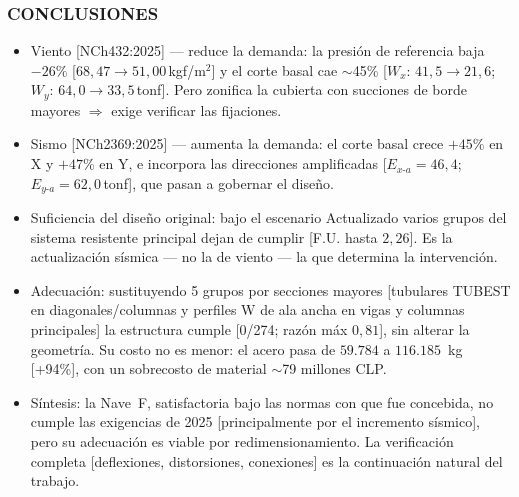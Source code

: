 ﻿\documentclass[11.5pt,aspectratio=169,handout]{beamer}
\newcommand{\ctitle}[1]{\frametitle{#1}}
\begin{document}
\begin{frame}
\ctitle{CONCLUSIONES}
\vspace{-2mm}
\begin{itemize}\scriptsize\setlength{\itemsep}{1.6mm}
  \item \alert{Viento [NCh432:2025]} --- \alert{reduce} la demanda: la presión de referencia
        baja $-26\%$ [$68{,}47 \to 51{,}00$\,kgf/m$^2$] y el corte basal cae $\sim$45\%
        [$W_x$: $41{,}5\to21{,}6$; $W_y$: $64{,}0\to33{,}5$\,tonf]. Pero zonifica la cubierta
        con \alert{succiones de borde mayores} $\Rightarrow$ exige verificar las fijaciones.
  \item \alert{Sismo [NCh2369:2025]} --- \alert{aumenta} la demanda: el corte basal crece
        $+45\%$ en X y $+47\%$ en Y, e incorpora las direcciones \alert{amplificadas}
        [$E_{x\text{-}a}=46{,}4$; $E_{y\text{-}a}=62{,}0$\,tonf], que pasan a \alert{gobernar}
        el diseño.
  \item \alert{Suficiencia del diseño original}: bajo el escenario Actualizado varios grupos
        del sistema resistente principal \alert{dejan de cumplir} [F.U. hasta $2{,}26$]. Es la
        actualización \alert{sísmica} --- no la de viento --- la que determina la intervención.
  \item \alert{Adecuación}: sustituyendo \alert{5 grupos} por secciones mayores [tubulares
        TUBEST en diagonales/columnas y \alert{perfiles W de ala ancha} en vigas y columnas
        principales] la estructura \alert{cumple} [0/274; razón máx $0{,}81$], sin alterar la
        geometría. Su costo no es menor: el acero pasa de $59.784$ a $116.185$~kg [\alert{+94\%}],
        con un sobrecosto de material $\sim$\alert{79 millones CLP}.
  \item \alert{Síntesis}: la Nave~F, satisfactoria bajo las normas con que fue concebida,
        \alert{no cumple} las exigencias de 2025 [principalmente por el incremento sísmico],
        pero su \alert{adecuación es viable} por redimensionamiento. La verificación completa
        [deflexiones, distorsiones, conexiones] es la continuación natural del trabajo.
\end{itemize}
\end{frame}

\end{document}
